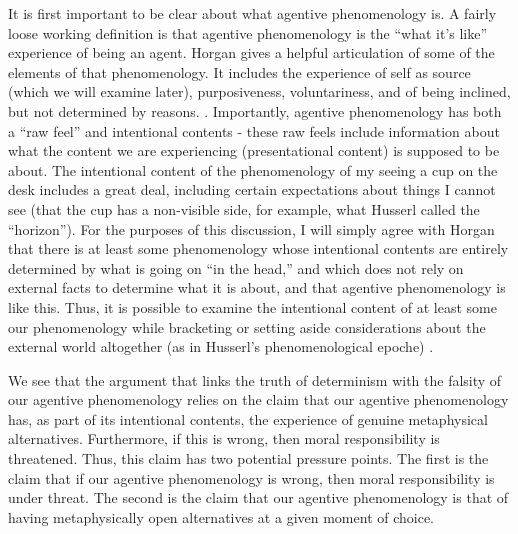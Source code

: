 \documentclass[phd,12pt,oneside,paper=letterpaper]{ubcthesis}
\begin{document}
It is first important to be clear about what agentive phenomenology is. A fairly loose working definition is that agentive phenomenology is the ``what it's like'' experience of being an agent.  Horgan gives a helpful articulation of some of the elements of that phenomenology. It includes the experience of self as source (which we will examine later), purposiveness, voluntariness, and of being inclined, but not determined by reasons. \citep{horgan2007}. Importantly, agentive phenomenology has both a ``raw feel'' and intentional contents - these raw feels include information about what the content we  are experiencing (presentational content) is supposed to be about. The intentional content of the phenomenology of my seeing a cup on the desk includes a great deal, including certain expectations about things I cannot see (that the cup has a non-visible side, for example, what Husserl called the ``horizon''). For the purposes of this discussion, I will simply agree with Horgan that there is at least some phenomenology whose intentional contents are entirely determined by what is going on ``in the head,'' and which does not rely on external facts to determine what it is about, and that agentive phenomenology is like this. Thus, it is possible to examine the intentional content of at least some our phenomenology while bracketing or setting aside considerations about the external world altogether (as in Husserl's phenomenological epoche) \citep{Husserl1999}. 

We see that the argument that links the truth of determinism with the falsity of our agentive phenomenology relies on the claim that our agentive phenomenology has, as part of its intentional contents, the experience of genuine metaphysical alternatives. Furthermore, if this is wrong, then moral responsibility is threatened. Thus, this claim has two potential pressure points. The first is the claim that if our agentive phenomenology is wrong, then moral responsibility is under threat. The second is the claim that our agentive phenomenology is that of having metaphysically open alternatives at a given moment of choice. 
\end{document}
